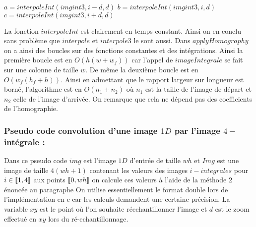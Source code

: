 \begin{algorithm}[H]
\caption{$interpoleTripleInt(imgint3,i,d)$}
$a=interpoleInt(imgint3,i-d,d)$\;
$b=interpoleInt(imgint3,i,d)$\;
$c=interpoleInt(imgint3,i+d,d)$\;
\end{algorithm}


La fonction $interpoleInt$ est clairement en temps constant. Ainsi on en conclu sans problème que $interpole$ et $interpole3$ le sont aussi. Dans $applyHomography$ on a ainsi des boucles sur des fonctions constantes et des intégrations. Ainsi la première boucle est en $O(h(w+w_f))$ car l'appel de $imageIntegrale$ se fait sur une colonne de taille $w$. De même la deuxième boucle est en $O(w_f(h_f+h))$.
\medbreak
Ainsi en admettant que le rapport largeur sur longueur est borné, l'algorithme est en $O(n_1+n_2)$ où $n_1$ est la taille de l'image de départ et $n_2$ celle de l'image d'arrivée. On remarque que cela ne dépend pas des coefficients de l'homographie.

\subsubsection{Pseudo code convolution d'une image $1D$ par l'image $4-$intégrale :}
 Dans ce pseudo code $img$ est l'image $1D$ d'entrée de taille $wh$ et $Img$ est une image de taille $4(wh+1)$ contenant les valeurs des images $i-integrales$ pour $i\in \llbracket 1,4 \rrbracket $ aux points $\llbracket 0,wh \rrbracket$ on calcule ces valeurs à l'aide de la méthode 2 énoncée au paragraphe 
 On utilise essentiellement le format double lors de l'implémentation en c car les calculs demandent une certaine précision. La variable $xy$ est le point où l'on souhaite réechantillonner l'image et $d$ est le zoom effectué en $xy$ lors du ré-echantillonnage.
 
 \begin{algorithm}
 \caption{$build4Integrale(img,Img)$}
 \end{algorithm}
 

